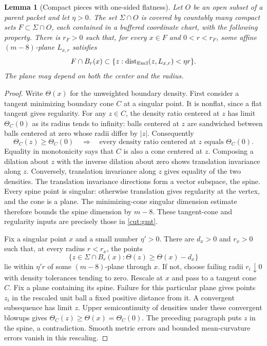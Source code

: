 \documentclass[11pt]{article}
\numberwithin{equation}{section}
\newtheorem{lemma}[theorem]{Lemma}
\theoremstyle{definition}
\theoremstyle{remark}
\begin{document}
\begin{lemma}[Compact pieces with one-sided flatness]\label{local:flat-pieces}
Let $O$ be an open subset of a parent packet and let $\eta>0$.
The set $\Sigma\cap O$ is covered by countably many compact sets
$F\subset\Sigma\cap O$, each contained in a buffered coordinate chart,
with the following property.  There is $r_F>0$ such that, for every
$x\in F$ and $0<r<r_F$, some affine $(m-8)$-plane $L_{x,r}$ satisfies
\begin{equation}\label{local:flatness}
 F\cap B_r(x)\subset\{z:\operatorname{dist}_{\rm Eucl}(z,L_{x,r})<\eta r\}.
\end{equation}
The plane may depend on both the center and the radius.
\end{lemma}
\begin{proof}
Write $\Theta(x)$ for the unweighted boundary density.  First consider
a tangent minimizing boundary cone $C$ at a singular point.  It is
nonflat, since a flat tangent gives regularity.  For any $z\in C$, the
density ratio centered at $z$ has limit $\Theta_C(0)$ as its radius
tends to infinity: balls centered at $z$ are sandwiched between balls
centered at zero whose radii differ by $|z|$.  Consequently
\[
 \Theta_C(z)\ge\Theta_C(0)
 \quad\Longrightarrow\quad
 \text{every density ratio centered at $z$ equals $\Theta_C(0)$}.
\]
Equality in monotonicity says that $C$ is also a cone centered at $z$.
Composing a dilation about $z$ with the inverse dilation about zero
shows translation invariance along $z$.  Conversely, translation
invariance along $z$ gives equality of the two densities.  The
translation invariance directions form a vector subspace, the spine.
Every spine point is singular: otherwise translation gives regularity
at the vertex, and the cone is a plane.  The minimizing-cone singular
dimension estimate therefore bounds the spine dimension by $m-8$.
These tangent-cone and regularity inputs are precisely those in
\cref{cut:gmt}.

Fix a singular point $x$ and a small number $\eta'>0$.  There are
$d_x>0$ and $r_x>0$ such that, at every radius $r<r_x$, the points
\begin{equation}\label{local:high-density}
 \{z\in\Sigma\cap B_r(x):\Theta(z)\ge\Theta(x)-d_x\}
\end{equation}
lie within $\eta'r$ of some $(m-8)$-plane through $x$.  If not, choose
failing radii $r_i\downarrow0$ with density tolerances tending to zero.
Rescale at $x$ and pass to a tangent cone $C$.  Fix a plane containing
its spine.  Failure for this particular plane gives points $z_i$ in
the rescaled unit ball a fixed positive distance from it.  A convergent
subsequence has limit $z$.  Upper semicontinuity of densities under
these convergent blowups gives
$\Theta_C(z)\ge\Theta(x)=\Theta_C(0)$.  The preceding paragraph puts
$z$ in the spine, a contradiction.  Smooth metric errors and bounded
mean-curvature errors vanish in this rescaling.


\end{proof}
\end{document}
